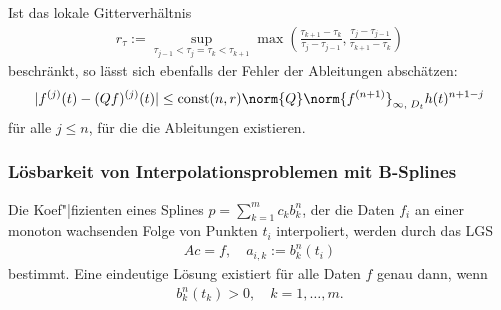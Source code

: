 Ist das lokale Gitterverhältnis
\begin{align*}
    r_\tau := \sup_{\tau_{j-1} < \tau_j = \tau_k < \tau_{k+1}} \max\left(
    \frac{\tau_{k+1} - \tau_k}{\tau_j - \tau_{j-1}},
    \frac{\tau_j - \tau_{j-1}}{\tau_{k+1} - \tau_k}\right)
\end{align*}
beschränkt, so lässt sich ebenfalls der Fehler der Ableitungen abschätzen:
\begin{align*}
    |f^{(j)}(t) - (Qf)^{(j)}(t)| \le \const(n, r)
    \norm{Q} \norm{f^{(n+1)}}_{\infty,\; D_t} h(t)^{n+1-j}
\end{align*}
für alle $j \le n$, für die die Ableitungen existieren.

\subsubsection{%
    Lösbarkeit von Interpolationsproblemen mit B-Splines%
}

Die Koef"|fizienten eines Splines $p = \sum_{k=1}^m c_k b_k^n$, der die Daten
$f_i$ an einer monoton wachsenden Folge von Punkten $t_i$ interpoliert, werden
durch das LGS
\begin{align*}
    Ac = f, \quad
    a_{i,k} := b_k^n(t_i)
\end{align*}
bestimmt.
Eine eindeutige Lösung existiert für alle Daten $f$ genau dann, wenn
\begin{align*}
    b_k^n(t_k) > 0, \quad
    k = 1, \dotsc, m.
\end{align*}

\pagebreak
